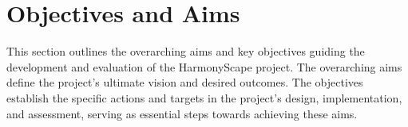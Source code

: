 \documentclass{l4proj}
\begin{document}





\section{Objectives and Aims}
This section outlines the overarching aims and key objectives guiding the development and evaluation of the HarmonyScape project. The overarching aims define the project's ultimate vision and desired outcomes. The objectives establish the specific actions and targets in the project's design, implementation, and assessment, serving as essential steps towards achieving these aims.
\end{document}
